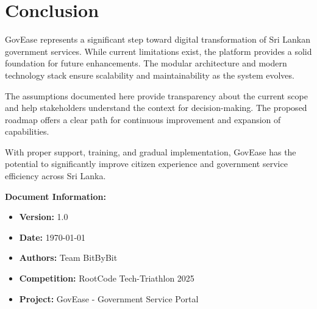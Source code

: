 \documentclass[11pt,a4paper]{article}
\begin{document}
\section{Conclusion}

GovEase represents a significant step toward digital transformation of Sri Lankan government services. While current limitations exist, the platform provides a solid foundation for future enhancements. The modular architecture and modern technology stack ensure scalability and maintainability as the system evolves.

The assumptions documented here provide transparency about the current scope and help stakeholders understand the context for decision-making. The proposed roadmap offers a clear path for continuous improvement and expansion of capabilities.

With proper support, training, and gradual implementation, GovEase has the potential to significantly improve citizen experience and government service efficiency across Sri Lanka.

\vspace{1cm}

\noindent\textbf{Document Information:}
\begin{itemize}[leftmargin=*]
    \item \textbf{Version:} 1.0
    \item \textbf{Date:} \today
    \item \textbf{Authors:} Team BitByBit
    \item \textbf{Competition:} RootCode Tech-Triathlon 2025
    \item \textbf{Project:} GovEase - Government Service Portal
\end{itemize}
\end{document}
